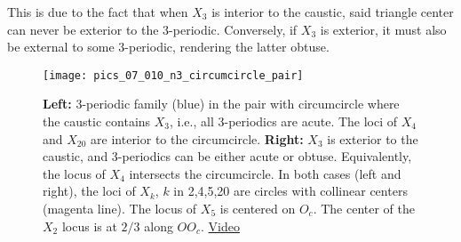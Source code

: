 This is due to the fact that when $X_3$ is interior to the caustic, said triangle center can never be exterior to the 3-periodic. Conversely, if $X_3$ is exterior, it must also be external to some 3-periodic, rendering the latter obtuse.

\begin{figure}
    \centering
    \texttt{[image: pics\_07\_010\_n3\_circumcircle\_pair]}
    \caption{\textbf{Left:} 3-periodic family (blue) in the pair with circumcircle where the caustic contains $X_3$, i.e., all 3-periodics are acute. The loci of $X_4$ and $X_{20}$ are interior to the circumcircle. \textbf{Right:} $X_3$ is exterior to the caustic, and 3-periodics can be either acute or obtuse. Equivalently, the locus of $X_4$ intersects the circumcircle. In both cases (left and right), the loci of $X_k$, $k$ in 2,4,5,20 are circles with collinear centers (magenta line). The locus of $X_5$ is centered on $O_c$. The center of the $X_2$ locus is at $2/3$ along $O O_c$. \href{https://youtu.be/HXgJQo2UT_8}{Video}}
    \label{fig:07-nonconcentric-circular}
\end{figure} 




